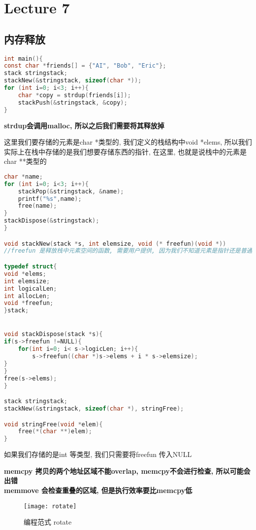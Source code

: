 \documentclass{article}
\begin{document}
\section{Lecture 7}
\subsection{内存释放}
\begin{lstlisting}[language = C]
int main(){
const char *friends[] = {"AI", "Bob", "Eric"};
stack stringstack;
stackNew(&stringstack, sizeof(char *));
for (int i=0; i<3; i++){
	char *copy = strdup(friends[i]);
	stackPush(&stringstack, &copy);
}
\end{lstlisting}
\textbf{strdup会调用malloc, 所以之后我们需要将其释放掉}

这里我们要存储的元素是char *类型的, 我们定义的栈结构中void *elems, 所以我们实际上在栈中存储的是我们想要存储东西的指针, 在这里, 也就是说栈中的元素是char **类型的

\begin{lstlisting}[language = C]
char *name;
for (int i=0; i<3; i++){
	stackPop(&stringstack, &name);
	printf("%s",name);
	free(name);
}
stackDispose(&stringstack);
}

void stackNew(stack *s, int elemsize, void (* freefun)(void *))
//freefun 是释放栈中元素空间的函数, 需要用户提供, 因为我们不知道元素是指针还是普通元素

typedef struct{
void *elems;
int elemsize;
int logicalLen;
int allocLen;
void *freefun;
}stack;


void stackDispose(stack *s){
if(s->freefun !=NULL){
	for(int i=0; i< s->logicLen; i++){
		s->freefun((char *)s->elems + i * s->elemsize);
}
}
free(s->elems);
}

stack stringstack;
stackNew(&stringstack, sizeof(char *), stringFree);

void stringFree(void *elem){
	free(*(char **)elem);
}
\end{lstlisting}
如果我们存储的是int 等类型, 我们只需要将freefun 传入NULL

\bigskip\noindent
\textbf{memcpy 拷贝的两个地址区域不能overlap, memcpy不会进行检查, 所以可能会出错\\
memmove 会检查重叠的区域, 但是执行效率要比memcpy低}

\begin{figure}[htbp]
	\centering
	\texttt{[image: rotate]}\\
	\caption{编程范式 rotate}\label{fig.rotate}
\end{figure}
\end{document}
